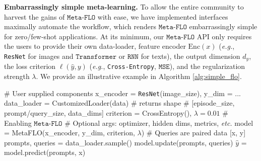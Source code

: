 \documentclass[nohyperref]{article}
\theoremstyle{plain}
\theoremstyle{definition}
\theoremstyle{remark}
\newcommand{\FLO}{\texttt{FLO}}
\newcommand{\metaflo}{\texttt{Meta-FLO} }
\begin{document}
{\bf Embarrassingly simple meta-learning.} To allow the entire community to harvest the gains of $\metaflo$ with ease, we have implemented interfaces maximally automate the workflow, which renders $\metaflo$ embarrassingly simple for zero/few-shot applications. At its minimum, our $\metaflo$ API only requires the users to provide their own data-loader, feature encoder $\text{Enc}(x)$ ({\it e.g.}, \texttt{ResNet} for images and $\texttt{Transformer}$ or $\texttt{RNN}$ for texts), the output dimension $d_y$, the loss criterion $\ell(\hat{y}, y)$ ({\it e.g.}, \texttt{Cross-Entropy}, $\texttt{MSE}$), and the regularization strength $\lambda$. We provide an illustrative example in Algorithm \ref{alg:simple_flo}. 

\begin{algorithm}[t!]
\caption{Embarrassingly simple $\metaflo$}
   \label{alg:simple_flo}
\begin{algorithmic}
\STATE \# User supplied components
\STATE x\_encoder = \texttt{ResNet}(image\_size), y\_dim = ...
\STATE data\_loader = CustomizedLoader(data) \# returns shape
\STATE \# [episode\_size, prompt/query\_size, data\_dims]
\STATE criterion = CrossEntropy(), $\lambda=0.01$
\STATE \# Enabling $\metaflo$
\STATE \# Optional args: optimizer, hidden dims, metrics, {\it etc.}
\STATE model = MetaFLO(x\_encoder, y\_dim, criterion, $\lambda$)
\STATE \# Queries are paired data [x, y]
\STATE prompts, queries =  data\_loader.sample()
\STATE model.update(prompts, queries)
\ENDFOR
\STATE $\hat{y}$ = model.predict(prompts, x) \\
\end{algorithmic}
\end{algorithm}

%
\end{document}
